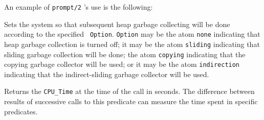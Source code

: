 \begin{description}
    An example of {\tt prompt/2} 's use is the following:


 Sets the system so that subsequent heap
    garbage collecting will be done according to the specified {\tt
    Option}.  {\tt Option} may be the atom \verb|none| indicating that
    heap garbage collection is turned off; it may be the atom
    \verb|sliding| indicating that sliding garbage collection will be
    done; the atom \verb|copying| indicating that the copying garbage
    collector will be used; or it may be the atom \verb|indirection|
    indicating that the indirect-sliding garbage collector will be
    used.  
 
    Returns the {\tt CPU\_Time} at the time of the call in seconds.
    The difference between results of successive calls to this
    predicate can measure the time spent in specific predicates.


\end{description}
